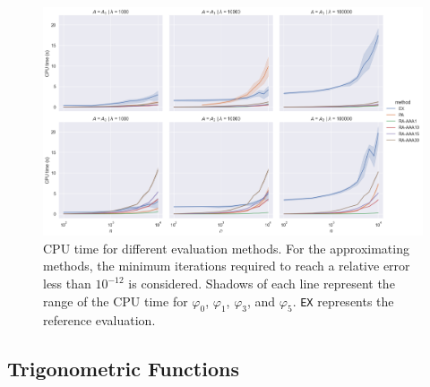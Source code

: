 \begin{figure}[h]
    \centering
    \includegraphics[width=.9\textwidth]{img/krylovapproximation/cputime_methods.png}
    \caption{
        CPU time for different evaluation methods. For the approximating methods,
        the minimum iterations required to reach a relative error less than $10^{-12}$
        is considered. Shadows of each line represent the range of the CPU time for
        $\varphi_0$, $\varphi_1$, $\varphi_3$, and $\varphi_5$.
        \texttt{EX} represents the reference evaluation.
    }
    \label{fig:krylovapproximationcputime}
\end{figure}

\FloatBarrier

\subsection{Trigonometric Functions}
\label{sec:resultstrigonometricfunctions}


